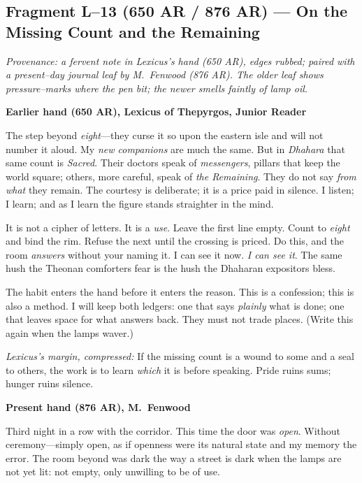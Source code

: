 \documentclass[11pt]{article}
\numberwithin{equation}{section} %
\theoremstyle{plain} %
\theoremstyle{definition} %
\theoremstyle{remark} %
\begin{document}
\subsection{Fragment L--13 (650 AR / 876 AR) --- On the Missing Count and the Remaining}
\label{frag:l13}

\noindent\textit{Provenance: a fervent note in Lexicus's hand (650 AR), edges rubbed; paired with a present--day journal leaf by M.\ Fenwood (876 AR). The older leaf shows pressure--marks where the pen bit; the newer smells faintly of lamp oil.}

\medskip
\noindent\textbf{Earlier hand (650 AR), Lexicus of Thepyrgos, Junior Reader}

The step beyond \emph{eight}---they curse it so upon the eastern isle and will not number it aloud. My \emph{new companions} are much the same. But in \textit{Dhahara} that same count is \emph{Sacred}. Their doctors speak of \emph{messengers}, pillars that keep the world square; others, more careful, speak of \emph{the Remaining}. They do not say \emph{from what} they remain. The courtesy is deliberate; it is a price paid in silence. I listen; I learn; and as I learn the figure stands straighter in the mind.

It is not a cipher of letters. It is a \emph{use}. Leave the first line empty. Count to \emph{eight} and bind the rim. Refuse the next until the crossing is priced. Do this, and the room \emph{answers} without your naming it. I can see it now. \emph{I can see it}. The same hush the Theonan comforters fear is the hush the Dhaharan expositors bless.

The habit enters the hand before it enters the reason. This is a confession; this is also a method. I will keep both ledgers: one that says \emph{plainly} what is done; one that leaves space for what answers back. They must not trade places. (Write this again when the lamps waver.)

\medskip
\noindent\textit{Lexicus's margin, compressed:} If the missing count is a wound to some and a seal to others, the work is to learn \emph{which} it is before speaking. Pride ruins sums; hunger ruins silence.

\medskip
\noindent\textbf{Present hand (876 AR), M.\ Fenwood}

Third night in a row with the corridor. This time the door was \emph{open}. Without ceremony---simply open, as if openness were its natural state and my memory the error. The room beyond was dark the way a street is dark when the lamps are not yet lit: not empty, only unwilling to be of use.
\end{document}

